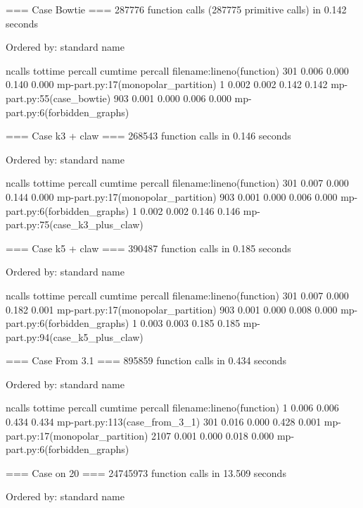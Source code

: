 \documentclass[11pt]{article}
\begin{document}
=== Case Bowtie ===
         287776 function calls (287775 primitive calls) in 0.142 seconds

   Ordered by: standard name

   ncalls  tottime  percall  cumtime  percall filename:lineno(function)
      301    0.006    0.000    0.140    0.000 mp-part.py:17(monopolar_partition)
        1    0.002    0.002    0.142    0.142 mp-part.py:55(case_bowtie)
      903    0.001    0.000    0.006    0.000 mp-part.py:6(forbidden_graphs)

      === Case k3 + claw ===
               268543 function calls in 0.146 seconds

         Ordered by: standard name

         ncalls  tottime  percall  cumtime  percall filename:lineno(function)
            301    0.007    0.000    0.144    0.000 mp-part.py:17(monopolar_partition)
            903    0.001    0.000    0.006    0.000 mp-part.py:6(forbidden_graphs)
              1    0.002    0.002    0.146    0.146 mp-part.py:75(case_k3_plus_claw)

              === Case k5 + claw ===
                       390487 function calls in 0.185 seconds

                 Ordered by: standard name

                 ncalls  tottime  percall  cumtime  percall filename:lineno(function)
                    301    0.007    0.000    0.182    0.001 mp-part.py:17(monopolar_partition)
                    903    0.001    0.000    0.008    0.000 mp-part.py:6(forbidden_graphs)
                      1    0.003    0.003    0.185    0.185 mp-part.py:94(case_k5_plus_claw)

                      === Case From 3.1 ===
                               895859 function calls in 0.434 seconds

                         Ordered by: standard name

                         ncalls  tottime  percall  cumtime  percall filename:lineno(function)
                              1    0.006    0.006    0.434    0.434 mp-part.py:113(case_from_3_1)
                            301    0.016    0.000    0.428    0.001 mp-part.py:17(monopolar_partition)
                           2107    0.001    0.000    0.018    0.000 mp-part.py:6(forbidden_graphs)

                           === Case on 20 ===
                                    24745973 function calls in 13.509 seconds

                              Ordered by: standard name
\end{document}
